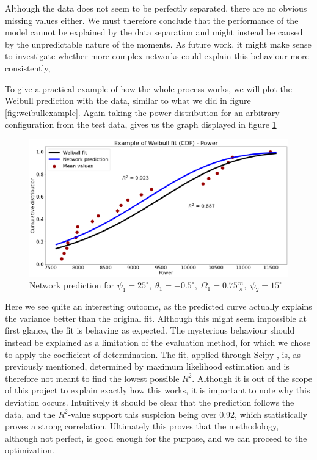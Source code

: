 Although the data does not seem to be perfectly separated, there are no obvious missing values either. We must therefore conclude that the performance of the model cannot be explained by the data separation and might instead be caused by the unpredictable nature of the moments. As future work, it might make sense to investigate whether more complex networks could explain this behaviour more consistently,

To give a practical example of how the whole process works, we will plot the Weibull prediction with the data, similar to what we did in figure \ref{fig:weibullexample}. Again taking the power distribution for an arbitrary configuration from the test data, gives us the graph displayed in figure \ref{fig:predictweibull}

\begin{figure}[H]
    \centering
    \includegraphics[scale=0.25]{Illustrations/predictiontestplot.png}
    \caption{Network prediction for $\psi_1 = 25^\circ, \; \theta_1 = -0.5^\circ, \; \Omega_1 = 0.75 \frac{m}{s}, \; \psi_2 = 15^\circ$}
    \label{fig:predictweibull}
\end{figure}

Here we see quite an interesting outcome, as the predicted curve actually explains the variance better than the original fit. Although this might seem impossible at first glance, the fit is behaving as expected. The mysterious behaviour should instead be explained as a limitation of the evaluation method, for which we chose to apply the coefficient of determination. The fit, applied through Scipy \cite{scipy}, is, as previously mentioned, determined by maximum likelihood estimation \cite{maxlikelihood} and is therefore not meant to find the lowest possible $R^2$. Although it is out of the scope of this project to explain exactly how this works, it is important to note why this deviation occurs. Intuitively it should be clear that the prediction follows the data, and the $R^2$-value support this suspicion being over 0.92, which statistically proves a strong correlation. Ultimately this proves that the methodology, although not perfect, is good enough for the purpose, and we can proceed to the optimization.  
